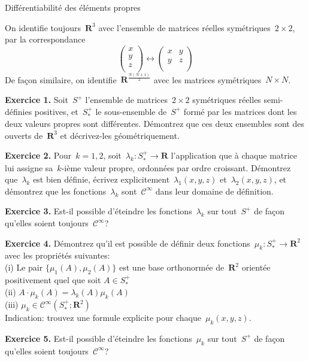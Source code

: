 \documentclass[a4paper,11pt]{article}
\def\R{\mathbf{R}}
\begin{document}
\thispagestyle{empty}

\begin{center}
	\Large Différentiabilité des éléments propres
\end{center}

On identifie toujours~$\R^3$ avec l'ensemble de matrices réelles symétriques~$2\times
2$, par la correspondance
\[
	\begin{pmatrix}
		x\\
		y\\
		z\\
	\end{pmatrix}
	\longleftrightarrow
	\begin{pmatrix}
		x & y \\
		y & z \\
	\end{pmatrix}
\]
De façon similaire, on identifie~$\R^{\frac{N(N+1)}{2}}$
avec les matrices symétriques~$N\times N$.

{\bf Exercice 1.}
Soit~$S^+$ l'ensemble de matrices~$2\times 2$ symétriques réelles semi-définies
positives, et~$S^+_*$ le sous-ensemble de~$S^+$ formé par les matrices dont les
deux valeurs propres sont différentes.  Démontrez que ces deux ensembles sont
des ouverts de~$\R^3$ et décrivez-les géométriquement.

{\bf Exercice 2.}
Pour~$k=1,2$, soit~$\lambda_k:S^+_*\to\R$ l'application que à chaque matrice
lui assigne sa~$k$-ième valeur propre, ordonnées par ordre croissant.
Démontrez que~$\lambda_k$ est bien définie,
écrivez
explicitement~$\lambda_1(x,y,z)$ et~$\lambda_2(x,y,z)$, et démontrez que les
fonctions~$\lambda_k$ sont~$\mathcal{C}^\infty$ dans leur domaine de
définition.

{\bf Exercice 3.} Est-il possible d'éteindre les fonctions~$\lambda_k$ sur
tout~$S^+$ de façon qu'elles soient toujours~$\mathcal{C}^\infty$?

{\bf Exercice 4.}
Démontrez qu'il est possible de définir deux fonctions~$\mu_k:S^+_*\to\R^2$
avec les propriétés suivantes:\\
(i) Le pair
$\{\mu_1(A),\mu_2(A)\}$ est une base orthonormée
de~$\R^2$ orientée positivement quel que soit
$A\in S^+_*$\\
(ii) $A\cdot\mu_k(A)=\lambda_k(A)\mu_k(A)$\\
(iii) $\mu_k\in\mathcal{C}^\infty(S^+_*;\R^2)$\\
Indication: trouvez une formule explicite pour chaque~$\mu_k(x,y,z)$.


{\bf Exercice 5.}
Est-il possible d'éteindre les fonctions~$\mu_k$ sur
tout~$S^+$ de façon qu'elles soient toujours~$\mathcal{C}^\infty$?
\end{document}
